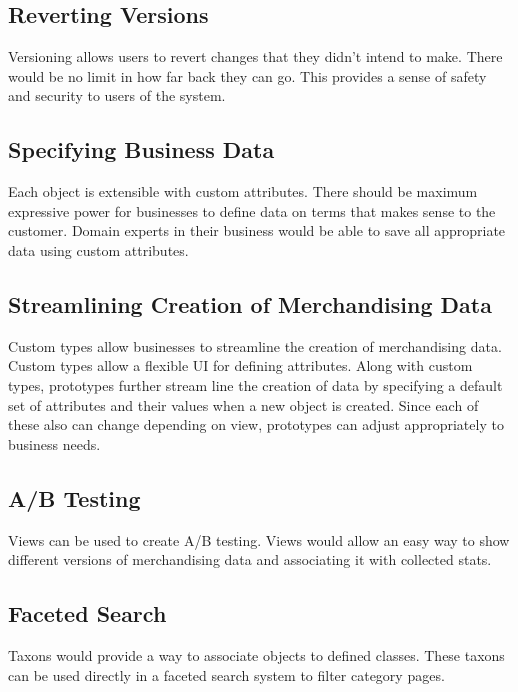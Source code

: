 \documentclass[11pt]{article}
\begin{document}
\subsection{Reverting Versions}

Versioning allows users to revert changes that they didn't intend to make. There 
would be no limit in how far back they can go. This provides a sense of safety 
and security to users of the system.  

\subsection{Specifying Business Data}

Each object is extensible with custom attributes. There should be maximum expressive
power for businesses to define data on terms that makes sense to the customer. 
Domain experts in their business would be able to save all appropriate data using
custom attributes.

\subsection{Streamlining Creation of Merchandising Data}

Custom types allow businesses to streamline the creation of merchandising data.
Custom types allow a flexible UI for defining attributes. Along with custom types,
prototypes further stream line the creation of data by specifying a default
set of attributes and their values when a new object is created. Since each
of these also can change depending on view, prototypes can adjust appropriately
to business needs.

\subsection{A/B Testing}

Views can be used to create A/B testing. Views would allow an easy way to show 
different versions of merchandising data and associating it with collected stats.

\subsection{Faceted Search}

Taxons would provide a way to associate objects to defined classes. These taxons
can be used directly in a faceted search system to filter category pages.
\end{document}
